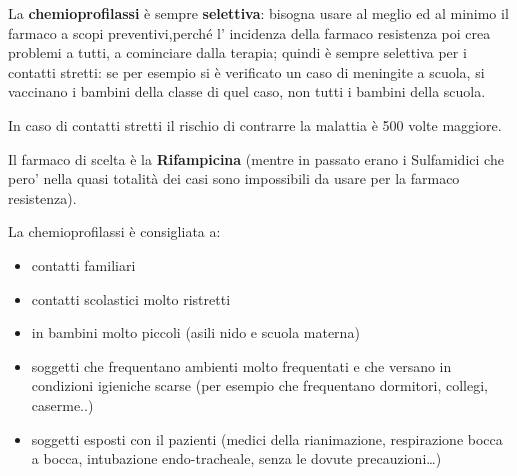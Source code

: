   La \textbf{chemioprofilassi} è sempre \textbf{selettiva}: bisogna
  usare al meglio ed al minimo il farmaco a scopi preventivi,perché l'
  incidenza della farmaco resistenza poi crea problemi a tutti, a
  cominciare dalla terapia; quindi è sempre selettiva per i contatti
  stretti: se per esempio si è verificato un caso di meningite a scuola,
  si vaccinano i bambini della classe di quel caso, non tutti i bambini
  della scuola.

  In caso di contatti stretti il rischio di contrarre la malattia è 500
  volte maggiore.

  Il farmaco di scelta è la \textbf{Rifampicina} (mentre in passato
  erano i Sulfamidici che pero' nella quasi totalità dei casi sono
  impossibili da usare per la farmaco resistenza).

  La chemioprofilassi è consigliata a:
  \begin{itemize}
  \item
  contatti familiari
\item
  contatti scolastici molto ristretti
\item
  in bambini molto piccoli (asili nido e scuola materna)
\item
  soggetti che frequentano ambienti molto frequentati e che versano in
  condizioni igieniche scarse (per esempio che frequentano dormitori,
  collegi, caserme..)
\item
  soggetti esposti con il pazienti (medici della rianimazione,
  respirazione bocca a bocca, intubazione endo-tracheale, senza le
  dovute precauzioni\ldots{})
\end{itemize}